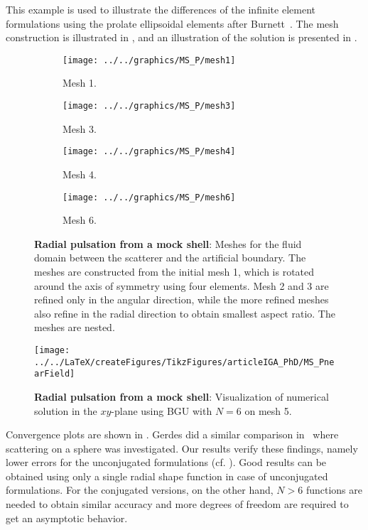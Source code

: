This example is used to illustrate the differences of the infinite element formulations using the prolate ellipsoidal elements after Burnett~\cite{Burnett1994atd}. The mesh construction is illustrated in , and an illustration of the solution is presented in .
\begin{figure}
	\centering    
	\begin{subfigure}{0.49\textwidth}
		\centering
		\texttt{[image: ../../graphics/MS\_P/mesh1]}
		\caption{Mesh 1.}
	\end{subfigure}%
	\hspace*{0.02\textwidth}%
	\begin{subfigure}{0.49\textwidth}
		\texttt{[image: ../../graphics/MS\_P/mesh3]}
		\caption{Mesh 3.}
	\end{subfigure}
	\par\bigskip
	\begin{subfigure}{0.49\textwidth}
		\centering
		\texttt{[image: ../../graphics/MS\_P/mesh4]}
		\caption{Mesh 4.}
	\end{subfigure}%
	\hspace*{0.02\textwidth}%
	\begin{subfigure}{0.49\textwidth}
		\texttt{[image: ../../graphics/MS\_P/mesh6]}
		\caption{Mesh 6.}
	\end{subfigure}
	\caption{\textbf{Radial pulsation from a mock shell}: Meshes for the fluid domain between the scatterer and the artificial boundary. The meshes are constructed from the initial mesh 1, which is rotated around the axis of symmetry using four elements. Mesh 2 and 3 are refined only in the angular direction, while the more refined meshes also refine in the radial direction to obtain smallest aspect ratio. The meshes are nested.}
	\label{Fig2:MS_meshes}
\end{figure}
\begin{figure}
	\centering
	\texttt{[image: ../../LaTeX/createFigures/TikzFigures/articleIGA\_PhD/MS\_PnearField]}
	\caption{\textbf{Radial pulsation from a mock shell}: Visualization of numerical solution in the $xy$-plane using BGU with $N=6$ on mesh 5.}
	\label{Fig2:MS_visualization}
\end{figure}
Convergence plots are shown in . Gerdes did a similar comparison in~\cite{Gerdes1998tcv} where scattering on a sphere was investigated. Our results verify these findings, namely lower errors for the unconjugated formulations (cf. ). Good results can be obtained using only a single radial shape function in case of unconjugated formulations. For the conjugated versions, on the other hand, $N > 6$ functions are needed to obtain similar accuracy and more degrees of freedom are required to get an asymptotic behavior.

